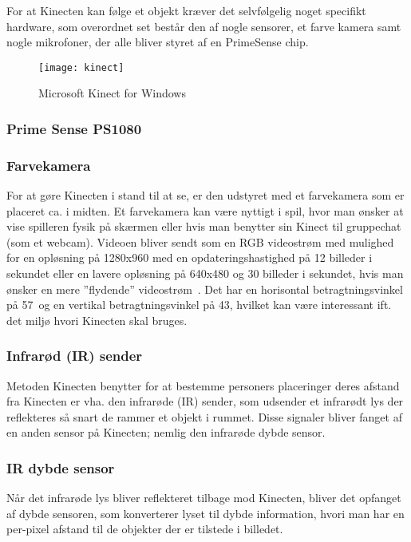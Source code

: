 For at Kinecten kan følge et objekt kræver det selvfølgelig noget specifikt hardware, som overordnet set består den af nogle sensorer, et farve kamera samt nogle mikrofoner, der alle bliver styret af en PrimeSense chip.

\begin{figure}
\centering
\texttt{[image: kinect]}
\caption{Microsoft Kinect for Windows}
\label{kinect:opbygning}
\end{figure}

\subsubsection{Prime Sense PS1080}

\subsubsection{Farvekamera}
For at gøre Kinecten i stand til at se, er den udstyret med et farvekamera som er placeret ca. i midten.
Et farvekamera kan være nyttigt i spil, hvor man ønsker at vise spilleren fysik på skærmen eller hvis man benytter sin Kinect til gruppechat (som et webcam).
Videoen bliver sendt som en RGB videostrøm med mulighed for en opløsning på 1280x960 med en opdateringshastighed på 12 billeder i sekundet eller en lavere opløsning på 640x480 og 30 billeder i sekundet, hvis man ønsker en mere ”flydende” videostrøm~\cite{kinectForWindowsFeatures}.
Det har en horisontal betragtningsvinkel på 57\degree~og en vertikal betragtningsvinkel på 43\degree, hvilket kan være interessant ift. det miljø hvori Kinecten skal bruges.

\subsubsection{Infrarød (IR) sender}
Metoden Kinecten benytter for at bestemme personers placeringer deres afstand fra Kinecten er vha. den infrarøde (IR) sender, som udsender et infrarødt lys der reflekteres så snart de rammer et objekt i rummet. 
Disse signaler bliver fanget af en anden sensor på Kinecten; nemlig den infrarøde dybde sensor.

\subsubsection{IR dybde sensor}
Når det infrarøde lys bliver reflekteret tilbage mod Kinecten, bliver det opfanget af dybde sensoren, som konverterer lyset til dybde information, hvori man har en per-pixel afstand til de objekter der er tilstede i billedet.

